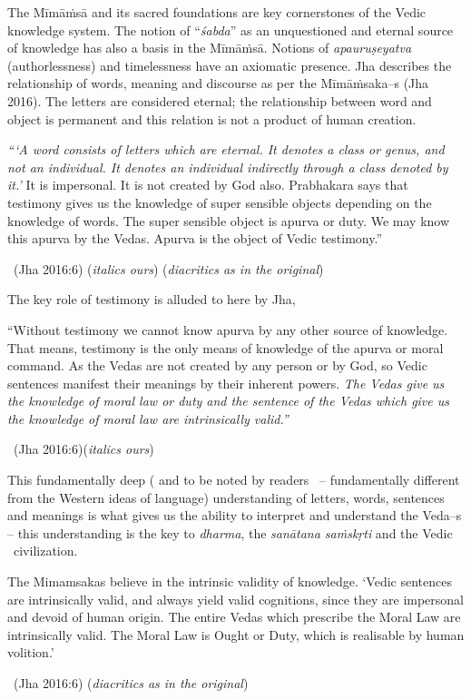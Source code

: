 The Mīmāṁsā and its sacred foundations are key cornerstones of the Vedic knowledge system. The notion of “\textit{śabda}” as an unquestioned and eternal source of knowledge has also a basis in the Mīmāṁsā. Notions of \textit{apauruṣeyatva} (authorlessness) and timelessness have an axiomatic presence. Jha describes the relationship of words, meaning and discourse as per the Mīmāṁsaka–s (Jha 2016). The letters are considered eternal; the relationship between word and object is permanent and this relation is not a product of human creation.

\begin{myquote}
\textit{“‘A word consists of letters which are eternal. It denotes a class or genus, and not an individual. It denotes an individual indirectly through a class denoted by it.’} It is impersonal. It is not created by God also. Prabhakara says that testimony gives us the knowledge of super sensible objects depending on the knowledge of words. The super sensible object is apurva or duty. We may know this apurva by the Vedas. Apurva is the object of Vedic testimony.” 

~\hfill (Jha 2016:6) (\textit{italics ours}) (\textit{diacritics as in the original})
\end{myquote}

The key role of testimony is alluded to here by Jha,

\begin{myquote}
“Without testimony we cannot know apurva by any other source of knowledge. That means, testimony is the only means of knowledge of the apurva or moral command. As the Vedas are not created by any person or by God, so Vedic sentences manifest their meanings by their inherent powers. \textit{The Vedas give us the knowledge of moral law or duty and the sentence of the Vedas which give us the knowledge of moral law are intrinsically valid.”} 

~\hfill (Jha 2016:6)(\textit{italics ours})
\end{myquote}

This fundamentally deep ( and to be noted by readers  – fundamentally different from the Western ideas of language) understanding of letters, words, sentences and meanings is what gives us the ability to interpret and understand the Veda–s – this understanding is the key to \textit{dharma}, the \textit{sanātana saṁskṛti} and the Vedic  civilization.

\begin{myquote}
The Mimamsakas believe in the intrinsic validity of knowledge. ‘Vedic sentences are intrinsically valid, and always yield valid cognitions, since they are impersonal and devoid of human origin. The entire Vedas which prescribe the Moral Law are intrinsically valid. The Moral Law is Ought or Duty, which is realisable by human volition.’ 

~\hfill (Jha 2016:6) (\textit{diacritics as in the original})
\end{myquote}


